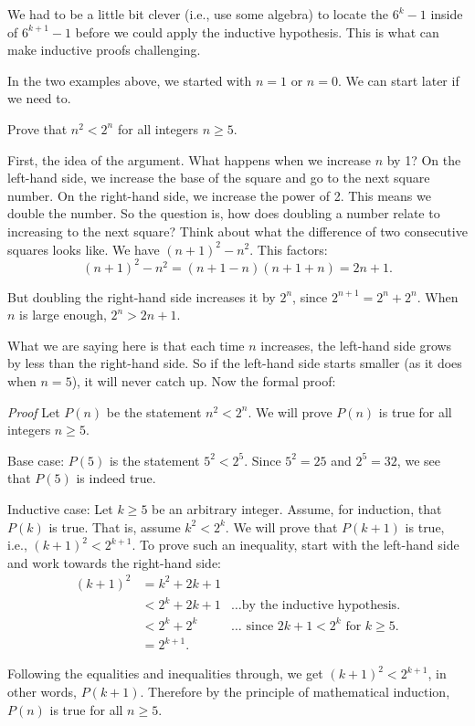 \documentclass[11pt,]{book}
\makeatletter
\theoremstyle{ptxplainnotitle}
\theoremstyle{ptxplaintitle}
\renewcommand*{\proofname}{Proof}
\renewenvironment{proof}[1][\proofname]{\par
  \pushQED{\qed}%
  \normalfont \topsep6\p@\@plus6\p@\relax
  \trivlist
  \item\relax
    {\itshape
    #1\@addpunct{.}}\hspace\labelsep\ignorespaces
}{%
  \popQED\endtrivlist\@endpefalse
}
\theoremstyle{ptxdefinitionnotitle}
\theoremstyle{ptxdefinitiontitle}
\theoremstyle{ptxdefinitionnotitle}
\theoremstyle{ptxdefinitiontitle}
\theoremstyle{ptxdefinitionnotitle}
\theoremstyle{ptxdefinitiontitle}
\theoremstyle{ptxdefinitiontitlenonumber}
\theoremstyle{ptxdefinitiontitlenonumber}
\numberwithin{equation}{chapter}
\newcommand{\lt}{<}
\newcommand{\amp}{&}
\makeatother
\begin{document}
\hypertarget{p-572}{}%
We had to be a little bit clever (i.e., use some algebra) to locate the \(6^k - 1\) inside of \(6^{k+1} - 1\) before we could apply the inductive hypothesis. This is what can make inductive proofs challenging.%
\par
\hypertarget{p-573}{}%
In the two examples above, we started with \(n = 1\) or \(n = 0\). We can start later if we need to.%
\begin{example}\label{example-27}
\hypertarget{p-574}{}%
Prove that \(n^2 \lt  2^n\) for all integers \(n \ge 5\).%
\par\smallskip%
\noindent\textbf{}\hypertarget{solution-85}{}\hypertarget{p-575}{}%
First, the idea of the argument. What happens when we increase \(n\) by 1? On the left-hand side, we increase the base of the square and go to the next square number. On the right-hand side, we increase the power of 2. This means we double the number. So the question is, how does doubling a number relate to increasing to the next square? Think about what the difference of two consecutive squares looks like. We have \((n+1)^2 - n^2\). This factors:%
\begin{equation*}
(n+1)^2 - n^2 = (n+1-n)(n+1+n) = 2n+1.
\end{equation*}
%
\par
\hypertarget{p-576}{}%
But doubling the right-hand side increases it by \(2^n\), since \(2^{n+1} = 2^n + 2^n\). When \(n\) is large enough, \(2^n > 2n + 1\).%
\par
\hypertarget{p-577}{}%
What we are saying here is that each time \(n\) increases, the left-hand side grows by less than the right-hand side. So if the left-hand side starts smaller (as it does when \(n = 5\)), it will never catch up. Now the formal proof:%
\begin{proof}\hypertarget{proof-4}{}
\hypertarget{p-578}{}%
Let \(P(n)\) be the statement \(n^2 \lt  2^n\). We will prove \(P(n)\) is true for all integers \(n \ge 5\).%
\par
\hypertarget{p-579}{}%
Base case: \(P(5)\) is the statement \(5^2 \lt  2^5\). Since \(5^2 = 25\) and \(2^5 = 32\), we see that \(P(5)\) is indeed true.%
\par
\hypertarget{p-580}{}%
Inductive case: Let \(k \ge 5\) be an arbitrary integer. Assume, for induction, that \(P(k)\) is true. That is, assume \(k^2 \lt  2^k\). We will prove that \(P(k+1)\) is true, i.e., \((k+1)^2 \lt  2^{k+1}\). To prove such an inequality, start with the left-hand side and work towards the right-hand side:%
\begin{align*}
(k+1)^2 \amp = k^2 + 2k + 1 \amp\\
\amp \lt 2^k + 2k + 1 \amp \ldots\text{by the inductive hypothesis.}\\
\amp \lt 2^k + 2^k \amp \ldots\text{ since } 2k + 1 \lt  2^k \text{ for }k \ge 5.\\
\amp = 2^{k+1}. \amp
\end{align*}
%
\par
\hypertarget{p-581}{}%
Following the equalities and inequalities through, we get \((k+1)^2 \lt  2^{k+1}\), in other words, \(P(k+1)\). Therefore by the principle of mathematical induction, \(P(n)\) is true for all \(n \ge 5\).%
\end{proof}
\end{example}
\end{document}

